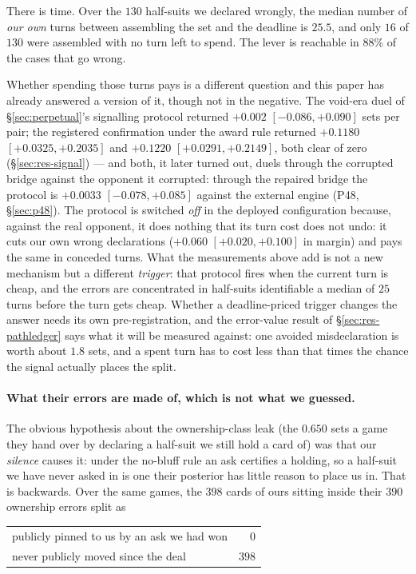 \documentclass[11pt,letterpaper]{article}
\begin{document}
There is time. Over the $130$ half-suits we declared wrongly, the median
number of \emph{our own} turns between assembling the set and the deadline is
$25.5$, and only $16$ of $130$ were assembled with no turn left to spend. The
lever is reachable in $88\%$ of the cases that go wrong.

Whether spending those turns pays is a different question and this paper has
already answered a version of it, though not in the negative. The void-era
duel of \S\ref{sec:perpetual}'s signalling protocol returned $+0.002$
$[-0.086, +0.090]$ sets per pair; the registered confirmation under the award
rule returned $+0.1180$ $[+0.0325, +0.2035]$ and $+0.1220$ $[+0.0291,
+0.2149]$, both clear of zero (\S\ref{sec:res-signal}) --- and both, it
later turned out, duels through the corrupted bridge against the opponent it
corrupted: through the repaired bridge the protocol is $+0.0033$
$[-0.078, +0.085]$ against the external engine (P48, \S\ref{sec:p48}). The protocol is
switched \emph{off} in the deployed configuration because, against the real
opponent, it does nothing that its turn cost does not undo: it cuts our own
wrong declarations ($+0.060$ $[+0.020, +0.100]$ in margin) and pays the same
in conceded turns. What the measurements above add is not a new mechanism but a
different \emph{trigger}: that protocol fires when the current turn is cheap,
and the errors are concentrated in half-suits identifiable a median of $25$
turns before the turn gets cheap. Whether a deadline-priced trigger changes
the answer needs its own pre-registration, and the error-value result of
\S\ref{sec:res-pathledger} says what it will be measured against: one avoided
misdeclaration is worth about $1.8$ sets, and a spent turn has to cost less
than that times the chance the signal actually places the split.

\paragraph{What their errors are made of, which is not what we guessed.} The
obvious hypothesis about the ownership-class leak (the $0.650$ sets a game
they hand over by declaring a half-suit we still hold a card of) was that
our \emph{silence} causes it: under the no-bluff rule an ask certifies a
holding, so a half-suit we have never asked in is one their posterior has
little reason to place us in. That is backwards. Over the same games, the $398$
cards of ours sitting inside their $390$ ownership errors split as

\begin{center}
\small
\begin{tabular}{lr}
\toprule
publicly pinned to us by an ask we had won & $0$ \\
never publicly moved since the deal & $398$ \\
\bottomrule
\end{tabular}
\end{center}
\end{document}
